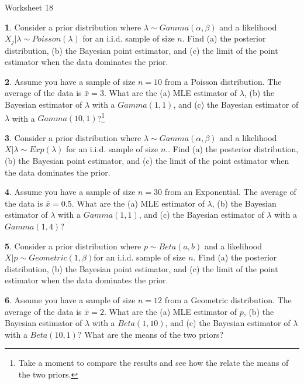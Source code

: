 \documentclass{tufte-handout}
\begin{document}
\justify

{\LARGE Worksheet 18}

\vspace*{18pt}


\textbf{1}. Consider a prior distribution where $\lambda \sim Gamma(\alpha, \beta)$ and a 
likelihood $X_j|\lambda \sim Poisson(\lambda)$ for an i.i.d. sample of size $n$.
Find (a) the posterior distribution, (b) the Bayesian point estimator, and (c) the
limit of the point estimator when the data dominates the prior.

\textbf{2}. Assume you have a sample of size $n = 10$ from a Poisson distribution. The 
average of the data is $\bar{x} = 3$. What are the (a) MLE estimator of $\lambda$,
(b) the Bayesian estimator of $\lambda$ with a $Gamma(1, 1)$, and (c) the
Bayesian estimator of $\lambda$ with a $Gamma(10, 1)$?\footnote{
  Take a moment to compare the results and see how the relate the means of the
  two priors.
}

\textbf{3}. Consider a prior distribution where $\lambda \sim Gamma(\alpha, \beta)$ and a 
likelihood $X|\lambda \sim Exp(\lambda)$ for an i.i.d. sample of size $n$..
Find (a) the posterior distribution, (b) the Bayesian point estimator, and (c) the
limit of the point estimator when the data dominates the prior.

\textbf{4}. Assume you have a sample of size $n = 30$ from an Exponential. The 
average of the data is $\bar{x} = 0.5$. What are the (a) MLE estimator of $\lambda$,
(b) the Bayesian estimator of $\lambda$ with a $Gamma(1, 1)$, and (c) the
Bayesian estimator of $\lambda$ with a $Gamma(1, 4)$?

\textbf{5}. Consider a prior distribution where $p \sim Beta(a, b)$ and a 
likelihood $X|p \sim Geometric(1, \beta)$for an i.i.d. sample of size $n$.
Find (a) the posterior distribution, (b) the Bayesian point estimator, and (c) the
limit of the point estimator when the data dominates the prior.

\textbf{6}. Assume you have a sample of size $n = 12$ from a Geometric distribution. The 
average of the data is $\bar{x} = 2$. What are the (a) MLE estimator of $p$,
(b) the Bayesian estimator of $\lambda$ with a $Beta(1, 10)$, and (c) the
Bayesian estimator of $\lambda$ with a $Beta(10, 1)$? What are the means of
the two priors?
\end{document}
